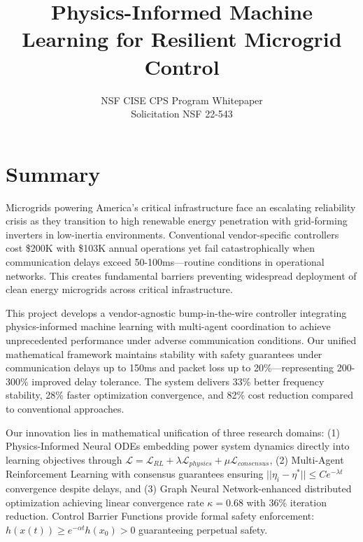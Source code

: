\documentclass[12pt]{article}
\begin{document}
\title{\large\textbf{Physics-Informed Machine Learning for Resilient Microgrid Control}}

\author{NSF CISE CPS Program Whitepaper\\
Solicitation NSF 22-543}

\date{}

\maketitle

\section{Summary}

Microgrids powering America's critical infrastructure face an escalating reliability crisis as they transition to high renewable energy penetration with grid-forming inverters in low-inertia environments. Conventional vendor-specific controllers cost \$200K with \$103K annual operations yet fail catastrophically when communication delays exceed 50-100ms—routine conditions in operational networks. This creates fundamental barriers preventing widespread deployment of clean energy microgrids across critical infrastructure.

This project develops a vendor-agnostic bump-in-the-wire controller integrating physics-informed machine learning with multi-agent coordination to achieve unprecedented performance under adverse communication conditions. Our unified mathematical framework maintains stability with safety guarantees under communication delays up to 150ms and packet loss up to 20\%—representing 200-300\% improved delay tolerance. The system delivers 33\% better frequency stability, 28\% faster optimization convergence, and 82\% cost reduction compared to conventional approaches.

Our innovation lies in mathematical unification of three research domains: (1) Physics-Informed Neural ODEs embedding power system dynamics directly into learning objectives through $\mathcal{L} = \mathcal{L}_{RL} + \lambda \mathcal{L}_{physics} + \mu \mathcal{L}_{consensus}$, (2) Multi-Agent Reinforcement Learning with consensus guarantees ensuring $||\eta_i - \eta^*|| \leq Ce^{-\lambda t}$ convergence despite delays, and (3) Graph Neural Network-enhanced distributed optimization achieving linear convergence rate $\kappa = 0.68$ with 36\% iteration reduction. Control Barrier Functions provide formal safety enforcement: $h(x(t)) \geq e^{-\alpha t}h(x_0) > 0$ guaranteeing perpetual safety.
\end{document}
